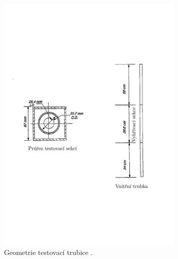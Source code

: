 \begin{figure}
	\centering
	\includegraphics[width=0.8\textwidth, trim={0cm 8cm 0cm 8cm}, clip]{./03_benchmark/obrazky/zeitoun_geometrie_translated.pdf}
	\caption{Geometrie testovací trubice \cite{zeitoun1994subcooled}.}
	\label{fig:zeitoun_geometrie}
\end{figure}

